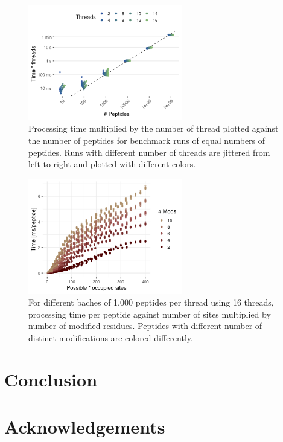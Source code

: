 \documentclass[]{article}
\begin{document}
\begin{figure}[!tpb]
	\centerline{\includegraphics[width=0.6\textwidth]{figures/benchmark_29.12.22_threads.png}}
	\caption{Processing time multiplied by the number of thread plotted against the number of peptides for benchmark runs of equal numbers of peptides. Runs with different number of threads are jittered from left to right and plotted with different colors.}\label{fig:performance_threads}
\end{figure}


\begin{figure}[!tpb]
\centerline{\includegraphics[width=0.6\textwidth]{figures/benchmark_29.12.22_size.png}}
\caption{For different baches of 1,000 peptides per thread using 16 threads, processing time per peptide against number of sites multiplied by number of modified residues. Peptides with different number of distinct modifications are colored differently.}\label{fig:performance_size}
\end{figure}


\section{Conclusion}


\section*{Acknowledgements}
\end{document}
